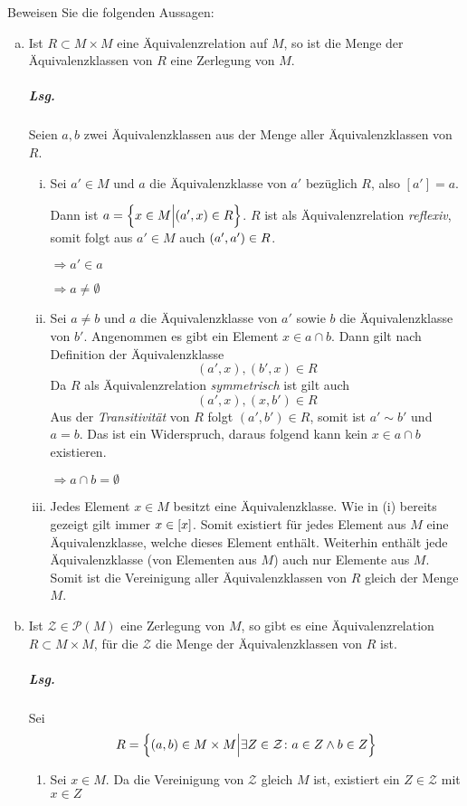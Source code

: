 \documentclass{scrreprt}
\begin{document}
Beweisen Sie die folgenden Aussagen:
\begin{enumerate}[(a)]
\item Ist $R \subset M \times M$ eine Äquivalenzrelation auf $M$, so ist die
  Menge der Äquivalenzklassen von $R$ eine Zerlegung von $M$.

  \subparagraph{Lsg.} Seien $a, b$ zwei Äquivalenzklassen aus der Menge aller
  Äquivalenzklassen von $R$.
  \begin{enumerate}[(i)]
  \item Sei $a' \in M$ und $a$ die Äquivalenzklasse von $a'$ bezüglich $R$,
    also $[a'] = a$.

    Dann ist $a = \qty{x \in M {\Big |} (a', x) \in R}$.
    $R$ ist als Äquivalenzrelation \emph{reflexiv}, somit folgt aus
    $a' \in M$ auch $\qty(a',a') \in R$.

    $\Rightarrow a' \in a$

    $\Rightarrow a \ne \emptyset$

  \item Sei $a \ne b$ und $a$ die Äquivalenzklasse von $a'$ sowie $b$ die
    Äquivalenzklasse von $b'$.
    Angenommen es gibt ein Element $x \in a \cap b$.
    Dann gilt nach Definition der Äquivalenzklasse
    \[
      (a', x), (b', x) \in R
    \]
    Da $R$ als Äquivalenzrelation \emph{symmetrisch} ist gilt auch
    \[
      (a', x), (x, b') \in R
    \]
    Aus der \emph{Transitivität} von $R$ folgt $(a', b') \in R$, somit
    ist $a' \sim b'$ und $a = b$.
    Das ist ein Widerspruch, daraus folgend kann kein $x \in a \cap b$
    existieren.

    $\Rightarrow a \cap b = \emptyset$

  \item Jedes Element $x \in M$ besitzt eine Äquivalenzklasse.
    Wie in (i) bereits gezeigt gilt immer $x \in \qty[x]$.
    Somit existiert für jedes Element aus $M$ eine Äquivalenzklasse, welche
    dieses Element enthält.
    Weiterhin enthält jede Äquivalenzklasse (von Elementen aus $M$) auch nur
    Elemente aus $M$.
    Somit ist die Vereinigung aller Äquivalenzklassen von $R$ gleich der Menge
    $M$.
  \end{enumerate}

\newpage
\item Ist $\mathcal{Z} \in \mathcal{P}(M)$ eine Zerlegung von $M$, so gibt es
  eine Äquivalenzrelation $R \subset M \times M$, für die $\mathcal{Z}$ die
  Menge der Äquivalenzklassen von $R$ ist.

  \subparagraph{Lsg.} Sei
  \[
    R = \qty\Big{ (a, b) \in M \times M {\Big |}
      \exists Z \in \mathcal{Z} \colon a \in Z \land b \in Z}
  \]
  \begin{enumerate}[1)]
  \item Sei $x \in M$.
    Da die Vereinigung von $\mathcal{Z}$ gleich $M$ ist,
    existiert ein $Z \in \mathcal{Z}$ mit $x \in Z$


\end{enumerate}
\end{enumerate}
\end{document}
